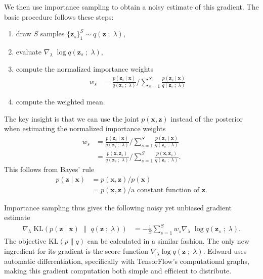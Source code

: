 We then use importance sampling to obtain a noisy estimate of this gradient.
The basic procedure follows these steps:
\begin{enumerate}
  \item draw $S$ samples $\{\mathbf{z}_s\}_1^S \sim q(\mathbf{z}\;;\;\lambda)$,
  \item evaluate $\nabla_\lambda\; \log q(\mathbf{z}_s\;;\;\lambda)$,
  \item compute the normalized importance weights
  \begin{align*}
    w_s
    &=
    \frac{p(\mathbf{z}_s \mid \mathbf{x})}{q(\mathbf{z}_s\;;\;\lambda)}
    \Bigg/
    \sum_{s=1}^{S}
    \frac{p(\mathbf{z}_s \mid \mathbf{x})}{q(\mathbf{z}_s\;;\;\lambda)}
  \end{align*}
  \item compute the weighted mean.
\end{enumerate}
The key insight is that we can use the joint $p(\mathbf{x},\mathbf{z})$ instead of the posterior
when estimating the normalized importance weights
\begin{align*}
  w_s
  &=
  \frac{p(\mathbf{z}_s \mid \mathbf{x})}{q(\mathbf{z}_s\;;\;\lambda)}
  \Bigg/
  \sum_{s=1}^{S}
  \frac{p(\mathbf{z}_s \mid \mathbf{x})}{q(\mathbf{z}_s\;;\;\lambda)} \\
  &=
  \frac{p(\mathbf{x}, \mathbf{z}_s)}{q(\mathbf{z}_s\;;\;\lambda)}
  \Bigg/
  \sum_{s=1}^{S}
  \frac{p(\mathbf{x}, \mathbf{z}_s)}{q(\mathbf{z}_s\;;\;\lambda)}.
\end{align*}
This follows from Bayes' rule
\begin{align*}
  p(\mathbf{z} \mid \mathbf{x})
  &=
  p(\mathbf{x}, \mathbf{z}) / p(\mathbf{x})\\
  &=
  p(\mathbf{x}, \mathbf{z}) / \text{a constant function of }\mathbf{z}.
\end{align*}

Importance sampling thus gives the following noisy yet unbiased gradient
estimate
\begin{align*}
\nabla_\lambda\;
  \text{KL}(
  p(\mathbf{z} \mid \mathbf{x})
  \;\|\;
  q(\mathbf{z}\;;\;\lambda)
  )
  &=
  -
  \frac{1}{S}
  \sum_{s=1}^S
  w_s
  \nabla_\lambda\; \log q(\mathbf{z}_s\;;\;\lambda).
\end{align*}
The objective $\text{KL}(p\|q)$ can be calculated in a similar fashion.
The only new ingredient for its gradient is the score function
$\nabla_\lambda \log q(\mathbf{z}\;;\;\lambda)$.  Edward uses automatic
differentiation, specifically with TensorFlow's computational graphs,
making this gradient computation both simple and efficient to
distribute.

